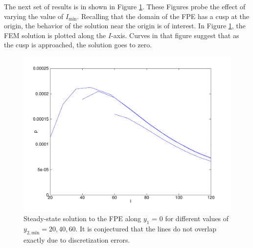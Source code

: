 The next set of results is in shown in Figure \ref{f:fpe_sigma_1_i_lim}. These Figures probe the effect of varying the value of $I_\text{min}$. Recalling that the domain of the FPE has a cusp at the origin, the behavior of the solution near the origin is of interest. In Figure \ref{f:fpe_sigma_1_i_lim}, the FEM solution is plotted along the $I$-axis. Curves in that figure suggest that as the cusp is approached, the solution goes to zero.

\begin{figure}
\begin{center}
\includegraphics[width=\textwidth,clip=true,viewport=10 10 570 420]{figures/autoparam/i_lim}
\caption{Steady-state solution to the FPE along $y_1$ = 0 for different values of $y_{2,\text{min}}=20,40,60$. It is conjectured that the lines do not overlap exactly due to discretization errors.}
\label{f:fpe_sigma_1_i_lim}
\end{center}
\end{figure}

